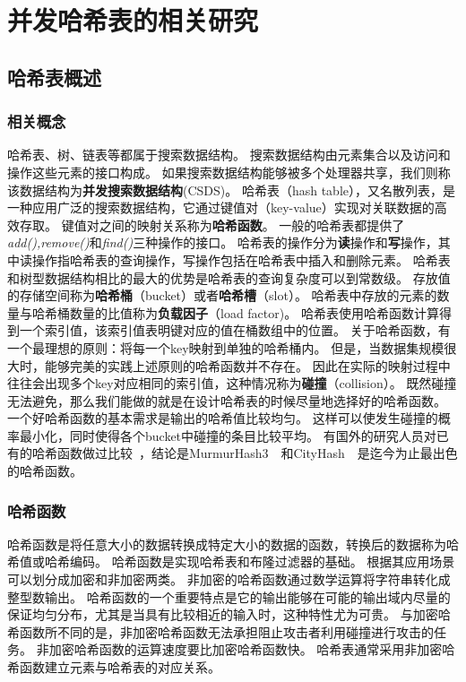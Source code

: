 \chapter{并发哈希表的相关研究}


\section{哈希表概述}

\subsection{相关概念}

哈希表、树、链表等都属于搜索数据结构。
搜索数据结构由元素集合以及访问和操作这些元素的接口构成。
如果搜索数据结构能够被多个处理器共享，我们则称该数据结构为\textbf{并发搜索数据结构}(CSDS)。
哈希表（hash table），又名散列表，是一种应用广泛的搜索数据结构，它通过键值对（key-value）实现对关联数据的高效存取。
键值对之间的映射关系称为\textbf{哈希函数}。
一般的哈希表都提供了\textit{add(),remove()}和\textit{find()}三种操作的接口。
哈希表的操作分为\textbf{读}操作和\textbf{写}操作，其中读操作指哈希表的查询操作，写操作包括在哈希表中插入和删除元素。
哈希表和树型数据结构相比的最大的优势是哈希表的查询复杂度可以到常数级。
存放值的存储空间称为\textbf{哈希桶}（bucket）或者\textbf{哈希槽}（slot）。
哈希表中存放的元素的数量与哈希桶数量的比值称为\textbf{负载因子}（load factor)。
哈希表使用哈希函数计算得到一个索引值，该索引值表明键对应的值在桶数组中的位置。
关于哈希函数，有一个最理想的原则：将每一个key映射到单独的哈希桶内。
但是，当数据集规模很大时，能够完美的实践上述原则的哈希函数并不存在。
因此在实际的映射过程中往往会出现多个key对应相同的索引值，这种情况称为\textbf{碰撞}（collision）。
既然碰撞无法避免，那么我们能做的就是在设计哈希表的时候尽量地选择好的哈希函数。
一个好哈希函数的基本需求是输出的哈希值比较均匀。
这样可以使发生碰撞的概率最小化，同时使得各个bucket中碰撞的条目比较平均。
有国外的研究人员对已有的哈希函数做过比较~\cite{Josh2012}，结论是MurmurHash3~\cite{Murmurhash}~和CityHash~\cite{cityhash}~是迄今为止最出色的哈希函数。

\subsection{哈希函数}
哈希函数是将任意大小的数据转换成特定大小的数据的函数，转换后的数据称为哈希值或哈希编码。
哈希函数是实现哈希表和布隆过滤器的基础。
根据其应用场景可以划分成加密和非加密两类。
非加密的哈希函数通过数学运算将字符串转化成整型数输出。
哈希函数的一个重要特点是它的输出能够在可能的输出域内尽量的保证均匀分布，尤其是当具有比较相近的输入时，这种特性尤为可贵。
与加密哈希函数所不同的是，非加密哈希函数无法承担阻止攻击者利用碰撞进行攻击的任务。
非加密哈希函数的运算速度要比加密哈希函数快。
哈希表通常采用非加密哈希函数建立元素与哈希表的对应关系。

